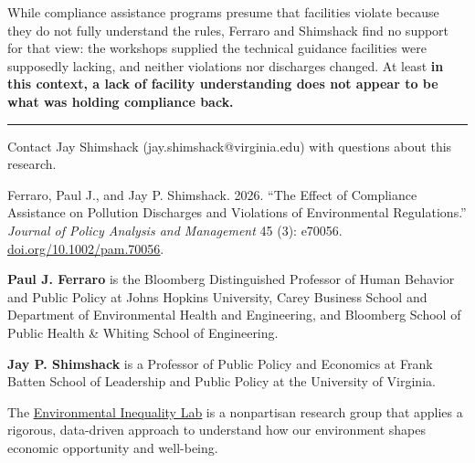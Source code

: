 \documentclass[
  11pt,
]{article}
\newenvironment{moreinfo}{%
  \par\vspace{12pt}%
  \noindent\textcolor{warmrule}{\rule{\linewidth}{0.7pt}}\par
  \vspace{7pt}%
  {\color{ink}\bfseries\fontsize{8.25pt}{10pt}\selectfont
   \textls[50]{\MakeUppercase{For more information}}\par}\vspace{4pt}%
  \color{cite}\fontsize{8.4pt}{11.5pt}\selectfont
  \setlength{\parskip}{5pt}%
}{\par}
\begin{document}
\vspace{6pt}

While compliance assistance programs presume that facilities violate because they do not fully understand the rules, Ferraro and Shimshack find no support for that view: the workshops supplied the technical guidance facilities were supposedly lacking, and neither violations nor discharges changed. At least \textbf{in this context, a lack of facility understanding does not appear to be what was holding compliance back.}

\begin{moreinfo}
Contact Jay Shimshack (jay.shimshack@virginia.edu) with questions about this research.\par

Ferraro, Paul J., and Jay P. Shimshack. 2026. ``The Effect of Compliance Assistance on Pollution Discharges and Violations of Environmental Regulations.'' \textit{Journal of Policy Analysis and Management} 45 (3): e70056. \href{https://doi.org/10.1002/pam.70056}{\color{cite}\underline{doi.org/10.1002/pam.70056}}.\par

\textbf{Paul J. Ferraro} is the Bloomberg Distinguished Professor of Human Behavior and Public Policy at Johns Hopkins University, Carey Business School and Department of Environmental Health and Engineering, and Bloomberg School of Public Health \& Whiting School of Engineering.\par
\textbf{Jay P. Shimshack} is a Professor of Public Policy and Economics at Frank Batten School of Leadership and Public Policy at the University of Virginia.\par

The \href{https://www.environmental-inequality-lab.org/}{\color{cite}\underline{Environmental Inequality Lab}} is a nonpartisan research group that applies a rigorous, data-driven approach to understand how our environment shapes economic opportunity and well-being.\par
\end{moreinfo}
\end{document}
